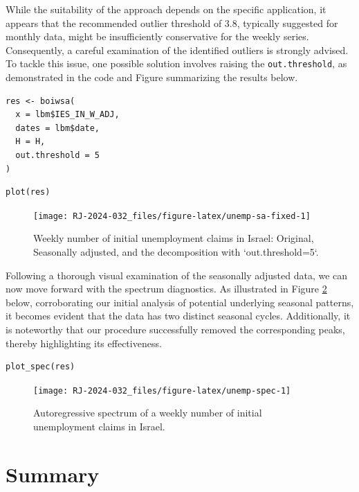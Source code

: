 While the suitability of the approach depends on the specific application, it appears that the recommended outlier threshold of 3.8, typically suggested for monthly data, might be insufficiently conservative for the weekly series. Consequently, a careful examination of the identified outliers is strongly advised. To tackle this issue, one possible solution involves raising the \texttt{out.threshold}, as demonstrated in the code and Figure summarizing the results below.

\begin{verbatim}
res <- boiwsa(
  x = lbm$IES_IN_W_ADJ,
  dates = lbm$date,
  H = H,
  out.threshold = 5
)
\end{verbatim}

\begin{verbatim}
plot(res)
\end{verbatim}

\begin{figure}[H]

{\centering \texttt{[image: RJ-2024-032\_files/figure-latex/unemp-sa-fixed-1]} 

}

\caption{Weekly number of initial unemployment claims in Israel: Original, Seasonally adjusted, and the decomposition with `out.threshold=5`.}\label{fig:unemp-sa-fixed}
\end{figure}

Following a thorough visual examination of the seasonally adjusted data, we can now move forward with the spectrum diagnostics. As illustrated in Figure \ref{fig:unemp-spec} below, corroborating our initial analysis of potential underlying seasonal patterns, it becomes evident that the data has two distinct seasonal cycles. Additionally, it is noteworthy that our procedure successfully removed the corresponding peaks, thereby highlighting its effectiveness.

\begin{verbatim}
plot_spec(res)
\end{verbatim}

\begin{figure}[H]

{\centering \texttt{[image: RJ-2024-032\_files/figure-latex/unemp-spec-1]} 

}

\caption{Autoregressive spectrum of a weekly number of initial unemployment claims in Israel.}\label{fig:unemp-spec}
\end{figure}

\hypertarget{summary}{%
\section{Summary}\label{summary}}

